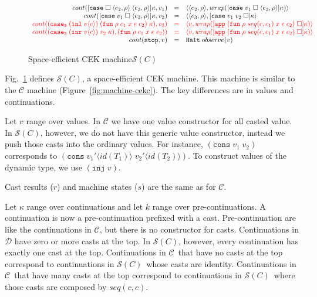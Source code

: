 \documentclass[acmsmall,review,anonymous]{acmart}\settopmatter{printfolios=true,printccs=false,printacmref=false}
\newcommand{\figref}[1]{Fig.~\ref{#1}}
\newcommand{\funrule}[3]{#1 &=& #2 & #3\\}
\newcommand{\hifunrule}[3]{\highlight{#1} &\highlight{=}& \highlight{#2} & 
\highlight{#3}\\}
\newcommand{\sOOinspect}[3]{\langle\langle#1,#2\rangle,#3\rangle}
\newcommand{\sOOreturn}[2]{\langle#1,#2\rangle}
\newcommand{\sOOhalt}[1]{\mathtt{Halt} \; #1}
\newcommand{\vOOcons}[2]{\mathtt{cons}\;#1\;#2}
\newcommand{\kOOmt}[0]{\mathtt{stop}}
\newcommand{\kOOappII}[2]{
	[\mathtt{app} \; #1 \; \square]#2}
\newcommand{\kOOcaseI}[4]{
	[\mathtt{case} \; \square \; \langle#1,#3\rangle \; \langle#2,#3\rangle ]#4}
\newcommand{\kOOcaseII}[4]{
	[\mathtt{case} \; #1 \; \square \; \langle#2,#3\rangle ]#4}
\newcommand{\kOOcaseIII}[3]{
	[\mathtt{case} \; #1 \; #2 \; \square]#3}
\newcommand{\hcvOOinj}[2]{\mathtt{inj} \; #2}
\newcommand{\hcvOOfun}[5]{\mathtt{fun} \; #2 \; #1 \; #3 \; #4 \; #5}
\newcommand{\hcvOOcons}[4]{\mathtt{cons}\;#1\langle#2\rangle\;#3\langle#4\rangle}
\newcommand{\hcvOOinl}[2]{\mathtt{inl}\;#1\langle#2\rangle}
\newcommand{\hcvOOinr}[2]{\mathtt{inr}\;#1\langle#2\rangle}
\newcommand{\hckOOmt}[0]{\mathtt{stop}}
\newcommand{\judgeSreduceTrans}[3]{#2 \longmapsto_{\mathcal{S}(#1)}^{*} #3}
\newcommand{\judgeSeval}[3]{eval_{\mathcal{S}(#1)}(#2) = #3}
\newcommand{\ineffCEK}{$\mathcal{C}$}
\newcommand{\ineffCEKD}{$\mathcal{D}$}
\newcommand{\effCEK}[1]{$\mathcal{S}(#1)$}
\newcommand{\continue}[2]{cont(#2,#1)}
\newcommand{\highlight}[1]{{\color{red} #1}}
\begin{document}
\begin{figure}
\[\begin{array}{rclr}
\funrule{
	\continue{v_1}{\kOOcaseI{e_2}{e_3}{\rho}{\kappa}}
}{
	\sOOinspect{e_2}{\rho}{
		wrap(\kOOcaseII{v_1}{e_3}{\rho}{\kappa})
	}
}{}

\funrule{
	\continue{v_2}{
		\kOOcaseII{v_1}{e_3}{\rho}{\kappa}
	}
}{
	\sOOinspect{e_3}{\rho}{
	\kOOcaseIII{v_1}{v_2}{\kappa}
	}
}{}

\hifunrule{
	\continue{v_3}{(\mathtt{case_3}\;(\hcvOOinl{v}{c})\;
		(\hcvOOfun{c_1}{\rho}{x}{e}{c_2})
		\;\kappa)}
}{
	\sOOreturn{v}{wrap(\kOOappII{(\hcvOOfun{seq(c,c_1)}{\rho}{x}{e}{c_2})}{\kappa})}
}{}

\hifunrule{
	\continue{(\hcvOOfun{c_1}{\rho}{x}{e}{c_2})}
	{(\mathtt{case_3}\;(\hcvOOinr{v}{c})\;v_2\;\kappa)}
}{
	\sOOreturn{v}{wrap(\kOOappII{(\hcvOOfun{seq(c,c_1)}{\rho}{x}{e}{c_2})}{\kappa})}
}{}

\funrule{
	\continue{v}{\kOOmt}}{
	\sOOhalt{observe(v)}}{}
	
	\end{array}\]
	
	
	
	\caption{Space-efficient CEK machine$\mathcal{S}(C)$}
	\label{fig:machine-cekcc}
\end{figure}

\figref{fig:machine-cekcc} defines \effCEK{C}, a space-efficient CEK
machine.  This machine is similar to the \ineffCEK{} machine
(Figure~\ref{fig:machine-cekc}).  The key differences are in values
and continuations.

Let $v$ range over values. In \ineffCEK{} we have one value
constructor for all casted value.  In \effCEK{C}, however, we do not
have this generic value constructor, instead we push those casts into
the ordinary values. For instance, $(\vOOcons{v_1}{v_2})$ corresponds
to $(\hcvOOcons{v_1'}{id(T_1)}{v_2'}{id(T_2)})$. To construct values
of the dynamic type, we use $(\hcvOOinj{P}{v})$.

Cast results ($r$) and machine states ($s$) are the same as for
\ineffCEK{}.

Let $\kappa$ range over continuations and let $k$ range over
pre-continuations.  A continuation is now a pre-continuation prefixed
with a cast.  Pre-continuation are like the continuations in
\ineffCEK{}, but there is no constructor for casts.  Continuations in
\ineffCEKD{} have zero or more casts at the top.  In \effCEK{C},
however, every continuation has exactly one cast at the top.
Continuations in \ineffCEK\ that have no casts at the top correspond
to continuations in \effCEK{C}\ whose casts are identity.
Continuations in \ineffCEK\ that have many casts at the top correspond
to continuations in \effCEK{C}\ where those casts are composed by
$seq(c,c)$.
\end{document}
